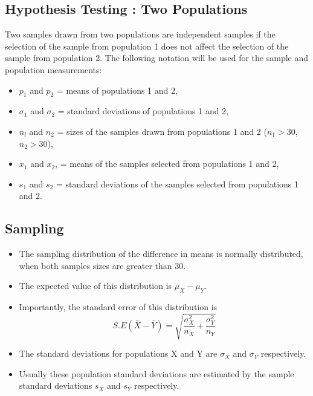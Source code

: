 \documentclass[]{report}
\begin{document}
\subsection{Hypothesis Testing : Two Populations}

Two samples drawn from two populations are independent samples if
the selection of the sample from population 1 does not affect the
selection of the sample from population 2. The following notation
will be used for the sample and population measurements:

\begin{itemize}
\item $p_1$ and $p_2$ = means of populations 1 and 2,

\item $\sigma_1$ and $\sigma_2$ = standard deviations of
populations 1 and 2,

\item $n_l$ and $n_2$ = sizes of the samples drawn from
populations 1 and 2 ($n_1 >30 $, $n_2 >30 $),

\item $x_1$ and $x_2$, = means of the samples selected from
populations 1 and 2,

\item $s_{1}$ and $s_{2}$ = standard deviations of the samples
selected from populations 1 and 2.

\end{itemize}





\subsection{Sampling}
\begin{itemize}
\item The sampling distribution of the difference in means is normally distributed, when both samples sizes are greater than 30.
\item The expected value of this distribution is $\mu_X - \mu_Y$.
\item Importantly, the standard error of this distribution is
\[ S.E(\bar{X} - \bar{Y}) = \sqrt{\frac{\sigma^2_X}{n_X} + \frac{\sigma^2_Y}{n_Y}} \]
\item The standard deviations for populations X and Y are $\sigma_X$ and $\sigma_Y$ respectively.
\item Usually these population standard deviations are estimated by the sample standard deviations $s_X$ and $s_Y$ respectively.
\end{itemize}
\end{document}

